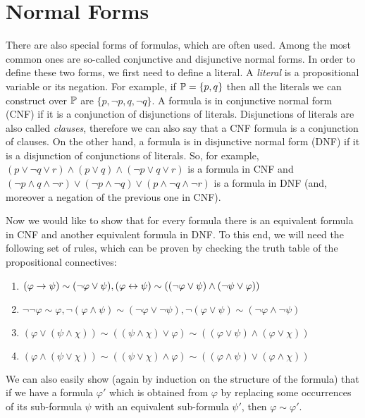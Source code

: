 \section{Normal Forms}

There are also special forms of formulas, which are often used. Among the most common ones are so-called conjunctive and disjunctive normal forms. In order to define these two forms, we first need to define a literal. A \emph{literal} is a propositional variable or its negation. For example, if $\mathbb{P} = \{p, q\}$ then all the literals we can construct over $\mathbb{P}$ are $\{p, \neg p, q, \neg q\}$. A formula is in conjunctive normal form (CNF) if it is a conjunction of disjunctions of literals. Disjunctions of literals are also called \emph{clauses}, therefore we can also say that a CNF formula is a conjunction of clauses. On the other hand, a formula is in disjunctive normal form (DNF) if it is a disjunction of conjunctions of literals. So, for example, $(p \lor \neg q \lor r) \land (p \lor q) \land (\neg p \lor q \lor r)$ is a formula in CNF and$(\neg p \land q \land \neg r) \lor (\neg p \land \neg q) \lor (p \land \neg q \land \neg r)$ is a formula in DNF (and, moreover a negation of the previous one in CNF). 

Now we would like to show that for every formula there is an equivalent formula in CNF and another equivalent formula in DNF. To this end, we will need the following set of rules, which can be proven by checking the truth table of the propositional connectives: 

\begin{enumerate}
  \item $(\varphi \to \psi) \sim (\neg \varphi \lor \psi), (\varphi \leftrightarrow \psi) \sim ((\neg \varphi \lor \psi) \land (\neg \psi \lor \varphi))$
  \item $\neg \neg \varphi \sim \varphi, \neg (\varphi \land \psi) \sim (\neg \varphi \lor \neg \psi), \neg (\varphi \lor \psi) \sim (\neg \varphi \land \neg \psi)$
  \item $(\varphi \lor (\psi \land \chi)) \sim ((\psi \land \chi)  \lor \varphi) \sim ((\varphi \lor \psi) \land (\varphi \lor \chi))$
  \item $(\varphi \land (\psi \lor \chi)) \sim ((\psi \lor \chi)  \land \varphi) \sim ((\varphi \land \psi) \lor (\varphi \land \chi))$
\end{enumerate}

We can also easily show (again by induction on the structure of the formula) that if we have a formula $\varphi'$ which is obtained from $\varphi$ by replacing some occurrences of its sub-formula $\psi$ with an equivalent sub-formula $\psi'$, then $\varphi \sim \varphi'$.

